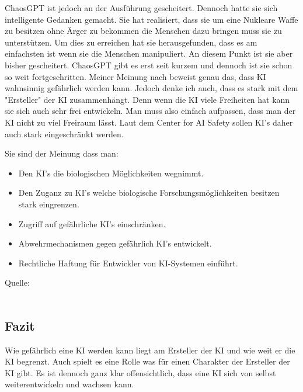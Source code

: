ChaosGPT ist jedoch an der Ausführung gescheitert. Dennoch hatte sie sich intelligente Gedanken gemacht. 
Sie hat realisiert, dass sie um eine Nukleare Waffe zu besitzen ohne Ärger zu bekommen die Menschen dazu bringen muss sie zu unterstützen.
Um dies zu erreichen hat sie herausgefunden, dass es am einfachsten ist wenn sie die Menschen manipuliert. An diesem Punkt ist sie aber bisher gescheitert.
ChaosGPT gibt es erst seit kurzem und dennoch ist sie schon so weit fortgeschritten. Meiner Meinung nach beweist genau das, dass KI wahnsinnig gefährlich werden kann. Jedoch denke ich auch, dass es stark mit dem "Ersteller" der KI zusammenhängt. 
Denn wenn die KI viele Freiheiten hat kann sie sich auch sehr frei entwickeln. Man muss also einfach aufpassen, dass man der KI nicht zu viel Freiraum lässt. Laut dem Center for AI Safety sollen KI's daher auch stark eingeschränkt werden.

Sie sind der Meinung dass man:
\begin{itemize}
    \item Den KI's die biologischen Möglichkeiten wegnimmt.
    \item Den Zuganz zu KI's welche biologische Forschungsmöglichkeiten besitzen stark eingrenzen.
    \item Zugriff auf gefährliche KI's einschränken.
    \item Abwehrmechanismen gegen gefährlich KI's entwickelt.
    \item Rechtliche Haftung für Entwickler von KI-Systemen einführt.
\end{itemize}
Quelle: \citep{ai-safety}
\\
\\
\subsection{Fazit}
Wie gefährlich eine KI werden kann liegt am Ersteller der KI und wie weit er die KI begrenzt. Auch spielt es eine Rolle was für einen Charakter der Ersteller der KI gibt. Es ist dennoch ganz klar offensichtlich, dass eine KI sich von selbst weiterentwickeln und wachsen kann.
\\
